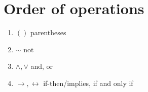 \documentclass[a4paper]{article}
\begin{document}
\section{Order of operations}
\begin{enumerate}
	\item $()$ parentheses
	\item $\sim$ not
	\item $\land, \lor$ and, or
	\item $\rightarrow, \leftrightarrow$ if-then/implies, if and only if
\end{enumerate}
\end{document}
